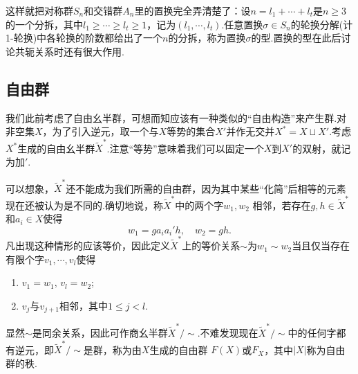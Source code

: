 这样就把对称群$S_n$和交错群$A_n$里的置换完全弄清楚了：设$n=l_1+\cdots+l_t$是$n\ge 3$的一个{\heiti 分拆}，其中$l_1\ge\cdots\ge l_t\ge 1$，记为$(l_1,\cdots,l_t)$.任意置换$\sigma\in S_n$的轮换分解(计1-轮换)中各轮换的阶数都给出了一个$n$的分拆，称为置换$\sigma$的{\heiti 型}.置换的型在此后讨论共轭关系时还有很大作用.
\subsection{自由群}\label{section:FreeGroup}
我们此前考虑了自由幺半群，可想而知应该有一种类似的“自由构造”来产生群.对非空集$X$，为了引入逆元，取一个与$X$等势的集合$X'$并作无交并$X^*=X\sqcup X'$.考虑$X^*$生成的自由幺半群$\widetilde{X}^*$.注意“等势”意味着我们可以固定一个$X$到$X'$的双射，就记为加$'$.

可以想象，$\widetilde{X}^*$还不能成为我们所需的自由群，因为其中某些“化简”后相等的元素现在还被认为是不同的.确切地说，称$\widetilde{X}^*$中的两个字$w_1,w_2$ {\heiti 相邻}，若存在$g,h\in\widetilde{X}^*$和$a_i\in X$使得
\[
	w_1=ga_ia_i'h,\quad w_2=gh.
\]
凡出现这种情形的应该等价，因此定义$\widetilde{X}^*$上的等价关系$\sim$为$w_1\sim w_2$当且仅当存在有限个字$v_1,\cdots,v_l$使得
\begin{enumerate}
	\item $v_1=w_1,\,v_l=w_2$;
	\item $v_j$与$v_{j+1}$相邻，其中$1\le j<l$.
\end{enumerate}
显然$\sim$是同余关系，因此可作商幺半群$\widetilde{X}^*/\sim$.不难发现现在$\widetilde{X}^*/\sim$中的任何字都有逆元，即$\widetilde{X}^*/\sim$是群，称为由$X$生成的{\heiti 自由群} $F(X)$或$F_X$，其中$|X|$称为自由群的{\heiti 秩}.

